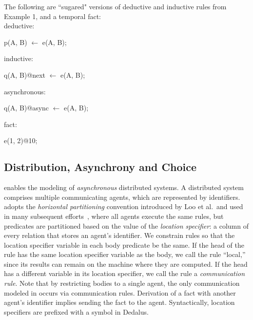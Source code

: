 
\begin{example}
The following are ``sugared" versions of deductive and inductive rules from Example 1, and a temporal fact:
\\
deductive:
\begin{Dedalus}
p(A, B) \(\leftarrow\) e(A, B);
\end{Dedalus}
inductive:
\begin{Dedalus}
q(A, B)@next \(\leftarrow\) e(A, B);
\end{Dedalus}
asynchronous:
\begin{Dedalus}
q(A, B)@async \(\leftarrow\) e(A, B);
\end{Dedalus}
fact:
\begin{Dedalus}
e(1, 2)@10;
\end{Dedalus}

\end{example}


\subsection{Distribution, Asynchrony and Choice}
\lang enables the modeling of {\em asynchronous} distributed systems.  A distributed system comprises multiple communicating agents, which are represented by identifiers.  \lang adopts the {\em horizontal partitioning} convention introduced by Loo et al.\ and used in many subsequent efforts~\cite{Loo:2005}, where all agents execute the same rules, but predicates are partitioned based on the value of the {\em location specifier}: a column of every relation that stores an agent's identifier.  We constrain \lang rules so that the location specifier variable in each body predicate be the same.  If the head of the rule has the same location specifier variable as the body, we call the rule ``local,'' since its results can remain on the machine where they are computed.  If the head has a different variable in its location specifier, we call the rule a {\em communication rule}.  Note that by restricting bodies to a single agent, the only communication modeled in \lang occurs via communication rules.  Derivation of a fact with another agent's identifier implies sending the fact to the agent.  Syntactically, location specifiers are prefixed with a \dedalus{\#} symbol in Dedalus.

